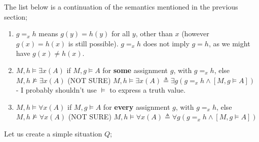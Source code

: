 \documentclass[a4paper, 12pt]{article}
\begin{document}
                The list below is a continuation of the semantics mentioned in the previous section;
                \begin{enumerate}[1.]
                    \itemsep0em
                    \setcounter{enumi}{5}
                    \item $g =_x h$ means $g(y) = h(y)$ for all $y$, other than $x$ (however $g(x) = h(x)$ is still possible). $g =_x h$ does not imply $g = h$, as we might have $g(x) \neq h(x)$.
                    \item $M, h \vDash \exists x (A)$ if $M, g \vDash A$ for \textbf{some} assignment $g$, with $g =_x h$, else $M, h \nvDash \exists x (A)$
                        \subitem (NOT SURE) $M, h \vDash \exists x (A) \triangleq \exists g (g =_x h \land [M, g \vDash A])$ - I probably shouldn't use $\vDash$ to express a truth value.
                    \item $M, h \vDash \forall x (A)$ if $M, g \vDash A$ for \textbf{every} assignment $g$, with $g =_x h$, else $M, h \nvDash \forall x (A)$
                        \subitem (NOT SURE) $M, h \vDash \forall x (A) \triangleq \forall g (g =_x h \land [M, g \vDash A])$
                \end{enumerate}
                Let us create a simple situation $Q$;
\end{document}
